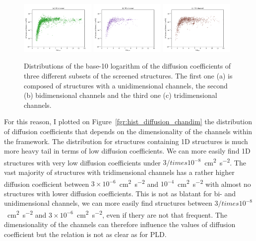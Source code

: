 \documentclass[main]{subfiles}
\begin{document}
\begin{figure}[ht]
  \centering
    \includegraphics[width=0.32\textwidth]{figures/5-diffusion/D_log-PLD_1D_chan.pdf}
    \includegraphics[width=0.32\textwidth]{figures/5-diffusion/D_log-PLD_2D_chan.pdf}
    \includegraphics[width=0.32\textwidth]{figures/5-diffusion/D_log-PLD_3D_chan.pdf}
    \caption{ Distributions of the base-10 logarithm of the diffusion coefficients of three different subsets of the screened structures. The first one (a) is composed of structures with a unidimensional channels, the second (b) bidimensional channels and the third one (c) tridimensional channels. }\label{fgr:scatter_diffusion_chandim}
\end{figure}

For this reason, I plotted on Figure~\ref{fgr:hist_diffusion_chandim} the distribution of diffusion coefficients that depends on the dimensionality of the channels within the framework. The distribution for structures containing 1D structures is much more heavy tail in terms of low diffusion coefficients. We can more easily find 1D structures with very low diffusion coefficients under $3/times 10^{-8}$~\si{\square\cm\per\square\s}. The vast majority of structures with tridimensional channels has a rather higher diffusion coefficient between $3\times 10^{-6}$~\si{\square\cm\per\square\s} and $10^{-4}$~\si{\square\cm\per\square\s} with almost no structures with lower diffusion coefficients. This is not as blatant for bi- and unidimensional channels, we can more easily find structures between $3/times 10^{-8}$~\si{\square\cm\per\square\s} and $3\times 10^{-6}$~\si{\square\cm\per\square\s}, even if thery are not that frequent. The dimensionality of the channels can therefore influence the values of diffusion coefficient but the relation is not as clear as for PLD.
\end{document}

